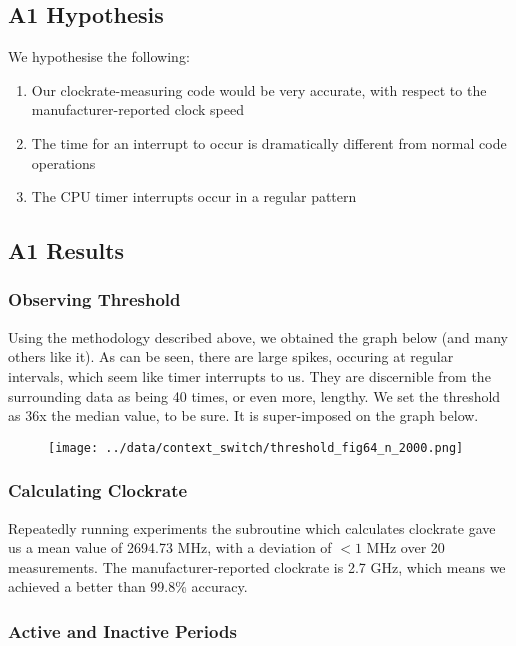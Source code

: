\documentclass[a4paper, 12pt]{article}
\begin{document}
\subsection{A1 Hypothesis}

We hypothesise the following:

\begin{enumerate}
\item   Our clockrate-measuring code would be very accurate, with respect to the manufacturer-reported clock speed
\item   The time for an interrupt to occur is dramatically different from normal code operations
\item   The CPU timer interrupts occur in a regular pattern
\end{enumerate}


\subsection{A1 Results}

\subsubsection{Observing Threshold}
Using the methodology described above, we obtained the graph below (and many others like it). As can be seen, there are large spikes, occuring at regular intervals, which seem like timer interrupts to us. They are discernible from the surrounding data as being 40 times, or even more, lengthy. We set the threshold as 36x the median value, to be sure. It is super-imposed on the graph below.

\begin{figure}[H]
    \centering
        \texttt{[image: ../data/context\_switch/threshold\_fig64\_n\_2000.png]}
\end{figure}

\subsubsection{Calculating Clockrate}

Repeatedly running experiments the subroutine which calculates clockrate gave us a mean value of 2694.73 MHz, with a deviation of $< 1$ MHz over 20 measurements. The manufacturer-reported clockrate is 2.7 GHz, which means we achieved a better than 99.8\% accuracy.

\subsubsection{Active and Inactive Periods}
\end{document}
